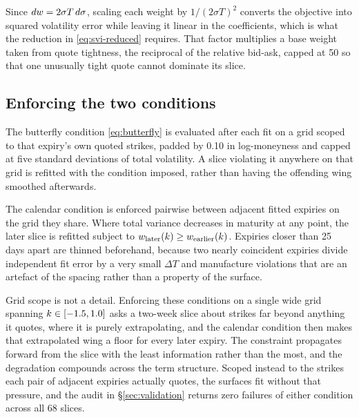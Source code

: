Since $dw = 2\sigma T\, d\sigma$, scaling each weight by
$1/(2\sigma T)^2$ converts the objective into squared volatility error while
leaving it linear in the coefficients, which is what the reduction in
\eqref{eq:svi-reduced} requires. That factor multiplies a base weight taken
from quote tightness, the reciprocal of the relative bid-ask, capped at 50 so
that one unusually tight quote cannot dominate its slice.

\subsection*{Enforcing the two conditions}

The butterfly condition \eqref{eq:butterfly} is evaluated after each fit on a
grid scoped to that expiry's own quoted strikes, padded by 0.10 in
log-moneyness and capped at five standard deviations of total volatility. A
slice violating it anywhere on that grid is refitted with the condition
imposed, rather than having the offending wing smoothed afterwards.

The calendar condition is enforced pairwise between adjacent fitted expiries on
the grid they share. Where total variance decreases in maturity at any point,
the later slice is refitted subject to
$w_{\text{later}}(k) \geq w_{\text{earlier}}(k)$. Expiries
closer than 25 days apart are thinned beforehand, because two nearly coincident
expiries divide independent fit error by a very small $\Delta T$ and manufacture
violations that are an artefact of the spacing rather than a property of the
surface.

Grid scope is not a detail. Enforcing these conditions on a single wide grid
spanning $k \in [-1.5, 1.0]$ asks a two-week slice about strikes far beyond
anything it quotes, where it is purely extrapolating, and the calendar
condition then makes that extrapolated wing a floor for every later expiry. The
constraint propagates forward from the slice with the least information rather
than the most, and the degradation compounds across the term structure. Scoped
instead to the strikes each pair of adjacent expiries actually quotes, the
surfaces fit without that pressure, and the audit in \S\ref{sec:validation}
returns zero failures of either condition across all 68 slices.
